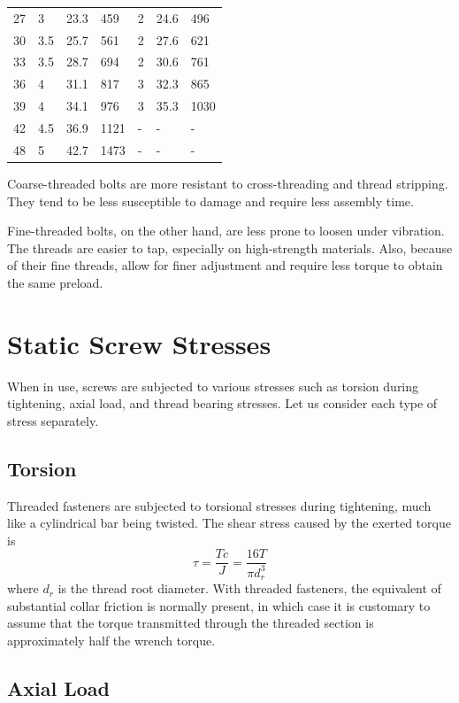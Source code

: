 \documentclass[
10pt,
a4paper,
openany,
svgnames,
]{book}
\begin{document}
\begin{table}[h]
\begin{tabular}{ L{2cm} C{1.5cm} C{1.5cm} C{1.5cm} C{1.5cm} C{1.5cm} C{1.5cm} }
      27 & 3 & 23.3 & 459 & 2 & 24.6 & 496 \\
      30 & 3.5 & 25.7 & 561 & 2 & 27.6 & 621 \\
      33 & 3.5 & 28.7 & 694 & 2 & 30.6 & 761 \\
      36 & 4 & 31.1 & 817 & 3 & 32.3 & 865 \\
      39 & 4 & 34.1 & 976 & 3 & 35.3 & 1030 \\
      42 & 4.5 & 36.9 & 1121 & - & - & - \\
      48 & 5 & 42.7 & 1473 & - & - & - \\
      \bottomrule
  \end{tabular}
\end{table}

Coarse-threaded bolts are more resistant to cross-threading and thread stripping. They tend to be less susceptible to damage and require less assembly time.

Fine-threaded bolts, on the other hand, are less prone to loosen under vibration. The threads are easier to tap, especially on high-strength materials. Also, because of their fine threads, allow for finer adjustment and require less torque to obtain the same preload.

\section{Static Screw Stresses}

When in use, screws are subjected to various stresses such as torsion during tightening, axial load, and thread bearing stresses. Let us consider each type of stress separately.

\subsection{Torsion}

Threaded fasteners are subjected to torsional stresses during tightening, much like a cylindrical bar being twisted. The shear stress caused by the exerted torque is
\[\tau  = \frac{Tc}{J} = \frac{16T}{\pi d_r^3}\]
where $d_r$ is the thread root diameter.
With threaded fasteners, the equivalent of substantial collar friction is normally present, in which case it is customary to assume that the torque transmitted through the threaded section is approximately half the wrench torque.

\subsection{Axial Load}
\end{document}

